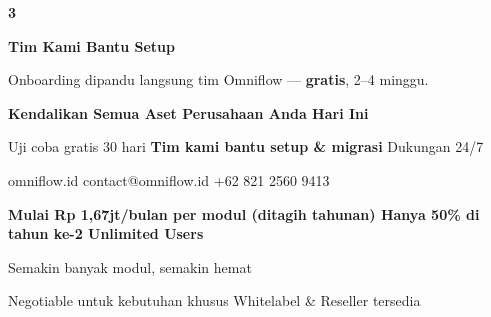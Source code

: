 \documentclass[a4paper]{article}
\begin{document}
\begin{center}
\begin{minipage}[t]{0.318\textwidth}
{\begin{minipage}[t][4.7cm][c]{\dimexpr\linewidth-2\fboxsep\relax}
            \begin{center}{\fontsize{22}{26}\selectfont\bfseries\color{BluePrimary} 3}\end{center}
            \vspace{2pt}
            \begin{center}
                {\fontsize{10}{13}\selectfont\bfseries\color{BlueDark} Tim Kami Bantu Setup}\par\vspace{3pt}
                {\fontsize{9}{12}\selectfont\color{TextDark} Onboarding dipandu langsung tim Omniflow --- \textbf{gratis}, 2--4 minggu.}
            \end{center}
        \end{minipage}}
\end{minipage}
\end{center}

\vspace{8pt}



{\setlength{\fboxsep}{10pt}\setlength{\fboxrule}{0pt}%
\noindent\colorbox{BluePrimary}{%
    \begin{minipage}{\dimexpr\textwidth-2\fboxsep\relax}
        \centering
        {\fontsize{13}{16}\selectfont\bfseries\color{White}
        Kendalikan Semua Aset Perusahaan Anda Hari Ini}\par\vspace{3pt}
        {\fontsize{9.5}{12}\selectfont\color{BlueMid}
        Uji coba gratis 30 hari \enspace\textbullet\enspace \textbf{Tim kami bantu setup \& migrasi} \enspace\textbullet\enspace Dukungan 24/7}\par\vspace{2pt}
        {\fontsize{9.5}{12}\selectfont\color{BlueLight}
        omniflow.id \enspace\textbullet\enspace contact@omniflow.id \enspace\textbullet\enspace +62 821 2560 9413}
    \end{minipage}}}

\vspace{6pt}

{\setlength{\fboxsep}{8pt}\setlength{\fboxrule}{0pt}%
\noindent\colorbox{BlueBg}{%
    \begin{minipage}{\dimexpr\textwidth-2\fboxsep\relax}
        \centering
        {\fontsize{9}{12}\selectfont\bfseries\color{BluePrimary}
        Mulai Rp 1,67jt/bulan per modul (ditagih tahunan) \enspace\textbullet\enspace Hanya 50\% di tahun ke-2 \enspace\textbullet\enspace Unlimited Users}\par\vspace{1pt}
        {\fontsize{8.5}{11}\selectfont\color{BlueDark}
        Semakin banyak modul, semakin hemat}\par\vspace{1pt}
        {\fontsize{8}{10}\selectfont\color{TextLight}
        Negotiable untuk kebutuhan khusus \enspace\textbullet\enspace Whitelabel \& Reseller tersedia}
    \end{minipage}}}


\pagestyle{empty}
\restoregeometry
\end{document}
